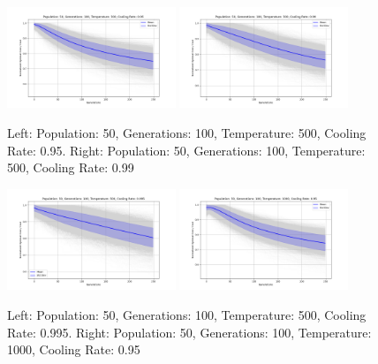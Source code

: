 \documentclass{article}
\begin{document}
    \begin{figure}[H]
        \centering
        \includegraphics[width=0.45\textwidth]{genetic_simulated_annealing_hybrid/appendix/Population_50_Generations_100_Temperature_500_CoolingRate_0.95.png}
        \includegraphics[width=0.45\textwidth]{genetic_simulated_annealing_hybrid/appendix/Population_50_Generations_100_Temperature_500_CoolingRate_0.99.png}
        \caption{Left: Population: 50, Generations: 100, Temperature: 500, Cooling Rate: 0.95. Right: Population: 50, Generations: 100, Temperature: 500, Cooling Rate: 0.99}
        \label{fig:app_ga_50_100_500_95_99}
    \end{figure}

    \begin{figure}[H]
        \centering
        \includegraphics[width=0.45\textwidth]{genetic_simulated_annealing_hybrid/appendix/Population_50_Generations_100_Temperature_500_CoolingRate_0.995.png}
        \includegraphics[width=0.45\textwidth]{genetic_simulated_annealing_hybrid/appendix/Population_50_Generations_100_Temperature_1000_CoolingRate_0.95.png}
        \caption{Left: Population: 50, Generations: 100, Temperature: 500, Cooling Rate: 0.995. Right: Population: 50, Generations: 100, Temperature: 1000, Cooling Rate: 0.95}
        \label{fig:app_ga_50_100_500_995_1000_95}
    \end{figure}
\end{document}
